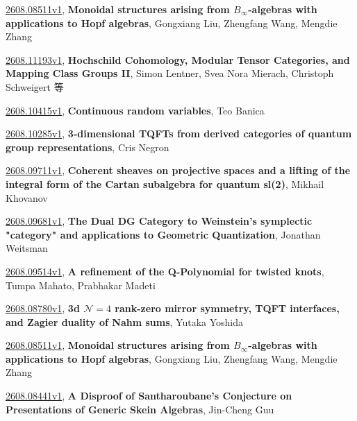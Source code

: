 \documentclass[9pt, a4paper]{article}
\theoremstyle{plain}
\theoremstyle{definition}
\theoremstyle{remark}
\newcommand{\arxiv}[3]{\href{https://arxiv.org/abs/#1}{#1}, \textbf{\textcolor{arxivblue}{#2}}, #3}
\begin{document}
\arxiv{2608.08511v1}{Monoidal structures arising from $B_\infty$-algebras with applications to Hopf algebras}{Gongxiang Liu, Zhengfang Wang, Mengdie Zhang}

\arxiv{2608.11193v1}{Hochschild Cohomology, Modular Tensor Categories, and Mapping Class Groups II}{Simon Lentner, Svea Nora Mierach, Christoph Schweigert 等}

\arxiv{2608.10415v1}{Continuous random variables}{Teo Banica}

\arxiv{2608.10285v1}{3-dimensional TQFTs from derived categories of quantum group representations}{Cris Negron}

\arxiv{2608.09711v1}{Coherent sheaves on projective spaces and a lifting of the integral form of the Cartan subalgebra for quantum sl(2)}{Mikhail Khovanov}

\arxiv{2608.09681v1}{The Dual DG Category to Weinstein's symplectic "category" and applications to Geometric Quantization}{Jonathan Weitsman}

\arxiv{2608.09514v1}{A refinement of the Q-Polynomial for twisted knots}{Tumpa Mahato, Prabhakar Madeti}

\arxiv{2608.08780v1}{3d $\mathcal N=4$ rank-zero mirror symmetry, TQFT interfaces, and Zagier duality of Nahm sums}{Yutaka Yoshida}

\arxiv{2608.08511v1}{Monoidal structures arising from $B_\infty$-algebras with applications to Hopf algebras}{Gongxiang Liu, Zhengfang Wang, Mengdie Zhang}

\arxiv{2608.08441v1}{A Disproof of Santharoubane's Conjecture on Presentations of Generic Skein Algebras}{Jin-Cheng Guu}

\end{document}
